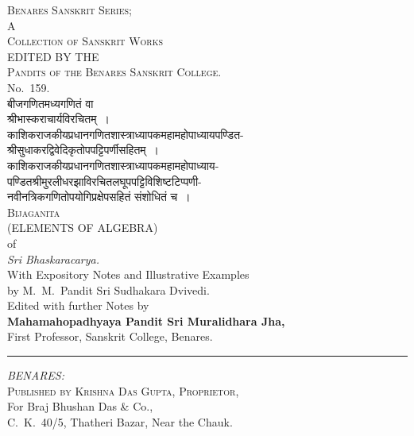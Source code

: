 \documentclass[11pt,a4paper]{article}
\newcommand{\shortline}{\noindent\rule{0.5\textwidth}{0.4pt}\par}
\begin{document}
\clearpage

\thispagestyle{empty}
\vspace*{3cm}
\begin{center}
{\large\scshape Benares Sanskrit Series;}\\[0.2cm]
{\normalsize A}\\[0.1cm]
{\large\scshape Collection of Sanskrit Works}\\[0.3cm]
{\footnotesize EDITED BY THE}\\[0.1cm]
{\normalsize\scshape Pandits of the Benares Sanskrit College.}\\[0.2cm]
{\normalsize No.~159.}\\[0.6cm]
{\LARGE\devanagarifont बीजगणितमध्यगणितं वा}\\[0.4cm]
{\Large\devanagarifont श्रीभास्कराचार्यविरचितम्~।}\\[0.5cm]
{\footnotesize\devanagarifont काशिकराजकीयप्रधानगणितशास्त्राध्यापकमहामहोपाध्यायपण्डित-}\\[0.1cm]
{\footnotesize\devanagarifont श्रीसुधाकरद्विवेदिकृतोपपट्टिपर्णीसहितम्~।}\\[0.3cm]
{\footnotesize\devanagarifont काशिकराजकीयप्रधानगणितशास्त्राध्यापकमहामहोपाध्याय-}\\[0.1cm]
{\footnotesize{} पण्डितश्रीमुरलीधरझाविरचितलघूपपट्टिविशिष्टटिप्पणी-}\\[0.1cm]
{\footnotesize{} नवीनत्रिकगणितोपयोगिप्रक्षेपसहितं संशोधितं च~।}\\[0.5cm]
{\Huge\scshape Bijaganita}\\[0.3cm]
{\normalsize (ELEMENTS OF ALGEBRA)}\\[0.2cm]
{\normalsize of}\\[0.2cm]
{\normalsize\itshape Sri Bhaskaracarya.}\\[0.3cm]
{\small With Expository Notes and Illustrative Examples}\\[0.1cm]
{\small by M.~M.~Pandit Sri Sudhakara Dvivedi.}\\[0.2cm]
{\small Edited with further Notes by}\\[0.1cm]
{\normalsize\bfseries Mahamahopadhyaya Pandit Sri Muralidhara Jha,}\\[0.1cm]
{\footnotesize First Professor, Sanskrit College, Benares.}\\[0.4cm]
\shortline
\vspace{0.3cm}
{\normalsize\itshape BENARES:}\\[0.2cm]
{\normalsize\scshape Published by Krishna Das Gupta, Proprietor,}\\[0.1cm]
{\small For Braj Bhushan Das \& Co.,}\\[0.1cm]
{\small C.~K.~40/5, Thatheri Bazar, Near the Chauk.}
\vspace{2cm}
\end{center}
\clearpage
\end{document}
